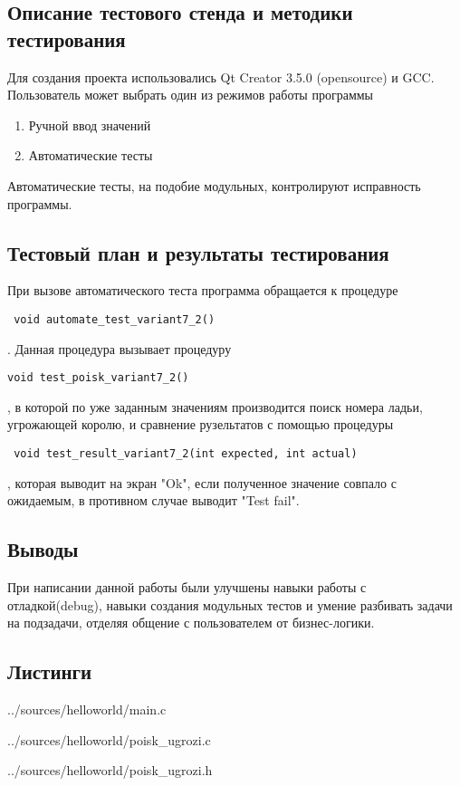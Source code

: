 \documentclass[12pt,a4paper]{report}
\begin{document}
\subsection{Описание тестового стенда и методики тестирования}
Для создания проекта использовались Qt Creator 3.5.0 (opensource) и GCC.
Пользователь может выбрать один из режимов работы программы

\begin{enumerate}
\item Ручной ввод значений
\item Автоматические тесты
\end{enumerate}

Автоматические тесты, на подобие модульных, контролируют исправность программы.
\subsection{Тестовый план и результаты тестирования}
При вызове автоматического теста программа обращается к процедуре\begin{verbatim} void automate_test_variant7_2()\end{verbatim}. Данная процедура вызывает процедуру \begin{verbatim}void test_poisk_variant7_2()\end{verbatim}, в которой по уже заданным значениям производится поиск номера ладьи, угрожающей королю, и сравнение рузельтатов с помощью процедуры\begin{verbatim} void test_result_variant7_2(int expected, int actual)\end{verbatim}, которая выводит на экран "Ok", если полученное значение совпало с ожидаемым, в противном случае выводит "Test fail".
\subsection{Выводы}
При написании данной работы были улучшены навыки работы с отладкой(debug), навыки создания модульных тестов и умение разбивать задачи на подзадачи, отделяя общение с пользователем от бизнес-логики.
\subsection*{Листинги}

{../sources/helloworld/main.c}


{../sources/helloworld/poisk_ugrozi.c}


{../sources/helloworld/poisk_ugrozi.h}
\end{document}
